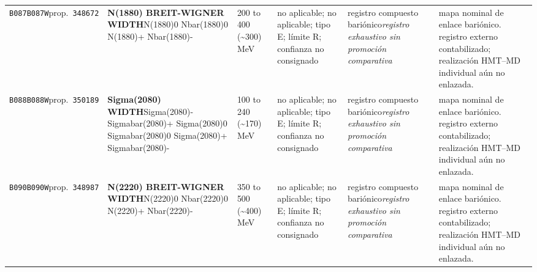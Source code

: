\begin{landscape}
\begin{longtable}{L{1.85cm}L{4.45cm}L{2.35cm}L{4.05cm}L{3.35cm}L{7.15cm}}
\texttt{B087}\newline \texttt{B087W}\newline prop.\ \texttt{348672} & \textbf{N(1880) BREIT-WIGNER WIDTH}\newline N(1880)0 \textbar{}\allowbreak{} Nbar(1880)0 \textbar{}\allowbreak{} N(1880)+ \textbar{}\allowbreak{} Nbar(1880)- & 200 to 400 (\textasciitilde{}300)\,MeV & no aplicable; no aplicable; tipo E; límite R; confianza no consignado & registro compuesto bariónico\newline \emph{registro exhaustivo sin promoción comparativa} & mapa nominal de enlace bariónico. registro externo contabilizado; realización HMT--MD individual aún no enlazada. \\
\texttt{B088}\newline \texttt{B088W}\newline prop.\ \texttt{350189} & \textbf{Sigma(2080) WIDTH}\newline Sigma(2080)- \textbar{}\allowbreak{} Sigmabar(2080)+ \textbar{}\allowbreak{} Sigma(2080)0 \textbar{}\allowbreak{} Sigmabar(2080)0 \textbar{}\allowbreak{} Sigma(2080)+ \textbar{}\allowbreak{} Sigmabar(2080)- & 100 to 240 (\textasciitilde{}170)\,MeV & no aplicable; no aplicable; tipo E; límite R; confianza no consignado & registro compuesto bariónico\newline \emph{registro exhaustivo sin promoción comparativa} & mapa nominal de enlace bariónico. registro externo contabilizado; realización HMT--MD individual aún no enlazada. \\
\texttt{B090}\newline \texttt{B090W}\newline prop.\ \texttt{348987} & \textbf{N(2220) BREIT-WIGNER WIDTH}\newline N(2220)0 \textbar{}\allowbreak{} Nbar(2220)0 \textbar{}\allowbreak{} N(2220)+ \textbar{}\allowbreak{} Nbar(2220)- & 350 to 500 (\textasciitilde{}400)\,MeV & no aplicable; no aplicable; tipo E; límite R; confianza no consignado & registro compuesto bariónico\newline \emph{registro exhaustivo sin promoción comparativa} & mapa nominal de enlace bariónico. registro externo contabilizado; realización HMT--MD individual aún no enlazada. \\

\end{longtable}
\end{landscape}

